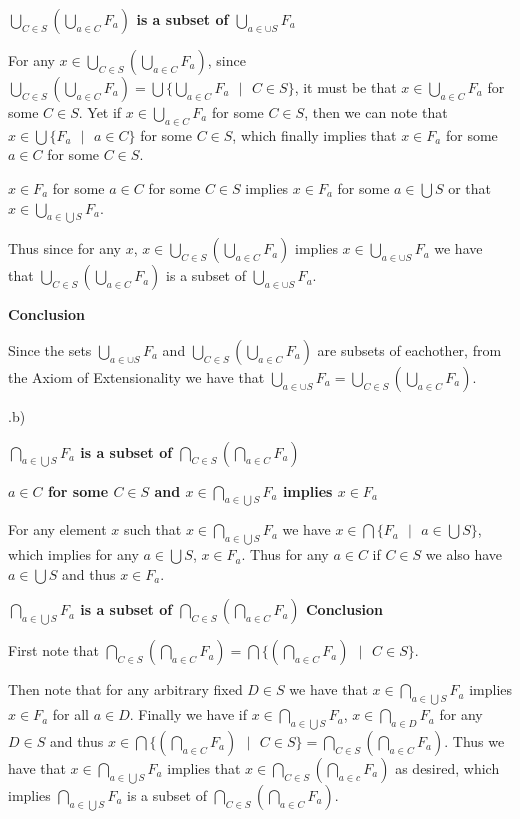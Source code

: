 \documentclass{article}
\begin{document}
\bigskip
\medskip
\textbf{$\bigcup_{C \in S}(\bigcup_{a \in C}F_a)$ is a subset of $\bigcup_{a \in \cup S} F_a$ }
\medskip

For any $x \in \bigcup_{C \in S}(\bigcup_{a \in C}F_a)$, since $\bigcup_{C \in S}(\bigcup_{a \in C}F_a) = \bigcup\{\bigcup_{a \in C}F_a \text{ } | \text{ } C \in S\}$, it must be that $x \in \bigcup_{a \in C}F_a$ for some $C \in S$. Yet if $x \in \bigcup_{a \in C}F_a$ for some $C \in S$, then we can note that $x \in \bigcup\{F_a \text{ } | \text{ } a \in C\}$ for some $C \in S$, which finally implies that $x \in F_a$ for some $a \in C$ for some $C \in S$.

\medskip
$x \in F_a$ for some $a \in C$ for some $C \in S$ implies $x \in F_a$ for some $a \in \bigcup S$ or that $x \in \bigcup_{a \in \bigcup S}F_a$.

\medskip
Thus since for any $x$, $x \in \bigcup_{C \in S}(\bigcup_{a \in C}F_a)$ implies $x \in \bigcup_{a \in \cup S} F_a$ we have that $\bigcup_{C \in S}(\bigcup_{a \in C}F_a)$ is a subset of $\bigcup_{a \in \cup S} F_a$.

\bigskip
\textbf{Conclusion}
\medskip

Since the sets $\bigcup_{a \in \cup S} F_a$ and $\bigcup_{C \in S}(\bigcup_{a \in C}F_a)$ are subsets of eachother, from the Axiom of Extensionality we have that $\bigcup_{a \in \cup S} F_a = \bigcup_{C \in S}(\bigcup_{a     \in C}F_a)$.

.b)

\medskip
\textbf{$\bigcap_{a \in \bigcup S} F_a$ is a subset of $\bigcap_{C \in S}(\bigcap_{a \in C} F_a)$}
\medskip

\medskip
\textbf{$a \in C$ for some $C \in S$ and $x \in \bigcap_{a \in \bigcup S}F_a$ implies $x \in F_a$}
\medskip

For any element $x$ such that $x \in \bigcap_{a \in \bigcup S} F_a$ we have $x \in \bigcap\{F_a \text{ } | \text{ } a \in \bigcup S\}$, which implies for any $a \in \bigcup S$, $x \in F_a$. Thus for any $a \in C$ if $C \in S$ we also have $a \in \bigcup S$ and thus $x \in F_a$.

\medskip
\textbf{$\bigcap_{a \in \bigcup S} F_a$ is a subset of $\bigcap_{C \in S}(\bigcap_{a \in C} F_a)$ Conclusion}
\medskip

First note that $\bigcap_{C \in S}(\bigcap_{a \in C} F_a) = \bigcap\{(\bigcap_{a \in C} F_a) \text{ } | \text{ } C \in S\}$.

\medskip
Then note that for any arbitrary fixed $D \in S$ we have that $x \in \bigcap_{a \in \bigcup S} F_a$ implies $x \in F_a$ for all $a \in D$. Finally we have if $x \in \bigcap_{a \in \bigcup S} F_a$, $x \in \bigcap_{a \in D} F_a$ for any $D \in S$ and thus $x \in \bigcap\{(\bigcap_{a \in C} F_a) \text{ } | \text { } C \in S\} = \bigcap_{C \in S}(\bigcap_{a \in C}F_a)$. Thus we have that $x \in \bigcap_{a \in \bigcup S} F_a$ implies that $x \in \bigcap_{C \in S}(\bigcap_{a \in c}F_a)$ as desired, which implies $\bigcap_{a \in \bigcup S} F_a$ is a subset of $\bigcap_{C \in S}(\bigcap_{a \in C} F_a)$.
\end{document}
